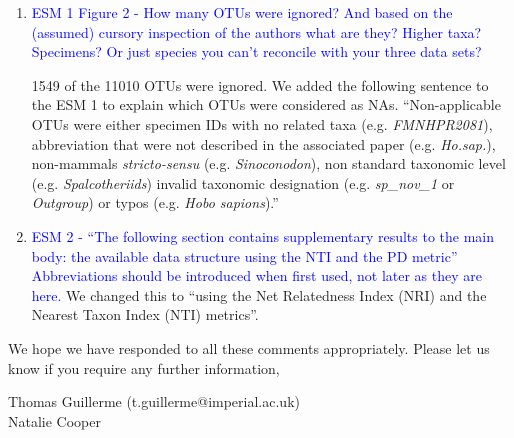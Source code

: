 \documentclass[12pt,letterpaper]{article}
\begin{document}
\begin{enumerate}
\item{\textcolor{blue}{ESM 1 Figure 2 - How many OTUs were ignored? And based on the (assumed) cursory inspection of the authors what are they? Higher taxa? Specimens? Or just species you can't reconcile with your three data sets?}}

1549 of the 11010 OTUs were ignored.
We added the following sentence to the ESM 1 to explain which OTUs were considered as NAs.
``Non-applicable OTUs were either specimen IDs with no related taxa (e.g. \textit{FMNHPR2081}), abbreviation that were not described in the associated paper (e.g. \textit{Ho.sap.}), non-mammals \textit{stricto-sensu} (e.g. \textit{Sinoconodon}), non standard taxonomic level (e.g. \textit{Spalcotheriids}) invalid taxonomic designation (e.g. \textit{sp\_nov\_1} or \textit{Outgroup}) or typos (e.g. \textit{Hobo sapions}).''

\item{\textcolor{blue}{ESM 2 - ``The following section contains supplementary results to the main body: the available data structure using the NTI and the PD metric'' Abbreviations should be introduced when first used, not later as they are here.}}
We changed this to ``using the Net Relatedness Index (NRI) and the Nearest Taxon Index (NTI) metrics''.

\end{enumerate}



We hope we have responded to all these comments appropriately. Please let us know if you require any further information,\\
\bigskip





Thomas Guillerme (t.guillerme@imperial.ac.uk)\\
Natalie Cooper
\end{document}
